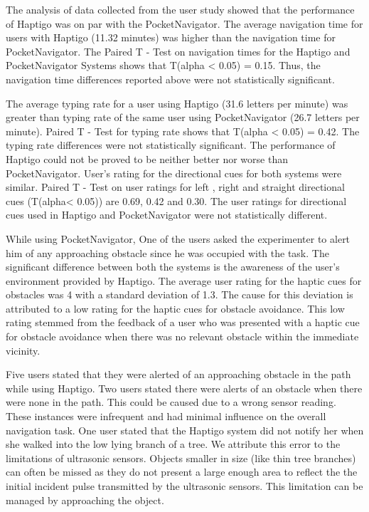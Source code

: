 \documentclass{sigchi}
\begin{document}
The analysis of data collected from the user study showed that the performance of Haptigo was on par with the PocketNavigator\cite{2010_Pielot_MobileHCI}. The average navigation time for users with Haptigo (11.32 minutes) was higher than the navigation time for PocketNavigator\cite{2010_Pielot_MobileHCI}. The Paired T - Test on navigation times for the Haptigo and PocketNavigator\cite{2010_Pielot_MobileHCI} Systems shows that T(alpha < 0.05) = 0.15. Thus, the navigation time differences reported above were not statistically significant.

The average typing rate for a user using Haptigo (31.6 letters per minute) was greater than typing rate of the same user using PocketNavigator\cite{2010_Pielot_MobileHCI} (26.7 letters per minute). Paired T - Test for typing rate shows that T(alpha < 0.05) = 0.42. The typing rate differences were not statistically significant. The performance of Haptigo could not be proved to be neither better nor worse than PocketNavigator\cite{2010_Pielot_MobileHCI}. User’s rating for the directional cues for both systems were similar. Paired T - Test on user ratings for left , right and straight directional cues (T(alpha< 0.05)) are 0.69, 0.42 and 0.30. The user ratings for directional cues used in Haptigo and PocketNavigator\cite{2010_Pielot_MobileHCI} were not statistically different.

While using PocketNavigator\cite{2010_Pielot_MobileHCI}, One of the users asked the experimenter to alert him of any approaching obstacle since he was occupied with the task. The significant difference between both the systems is the awareness of the user’s environment provided by Haptigo. The average user rating for the haptic cues for obstacles was 4 with a standard deviation of 1.3. The cause for this deviation is attributed to a low rating for the haptic cues for obstacle avoidance. This low rating stemmed from the feedback of a user who was presented with a haptic cue for obstacle avoidance when there was no relevant obstacle within the immediate vicinity.

Five users stated that they were alerted of an approaching obstacle in the path while using Haptigo. Two users stated there were alerts of an obstacle when there were none in the path. This could be caused due to a wrong sensor reading. These instances were infrequent and had minimal influence on the overall navigation task. One user stated that the Haptigo system did not notify her when she walked into the low lying branch of a tree. We attribute this error to the limitations of ultrasonic sensors. Objects smaller in size (like thin tree branches) can often be missed as they do not present a large enough area to reflect the the initial incident pulse transmitted by the ultrasonic sensors. This limitation can be managed by approaching the object.
\end{document}
